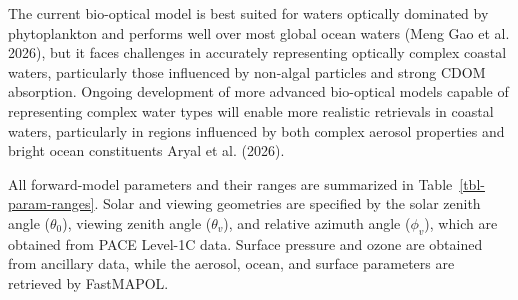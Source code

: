 \documentclass[
  11pt,
  letterpaper,
  DIV=11,
  numbers=noendperiod]{scrreprt}
\begin{document}
The current bio-optical model is best suited for waters optically
dominated by phytoplankton and performs well over most global ocean
waters (Meng Gao et al. 2026), but it faces challenges in accurately
representing optically complex coastal waters, particularly those
influenced by non-algal particles and strong CDOM absorption. Ongoing
development of more advanced bio-optical models capable of representing
complex water types will enable more realistic retrievals in coastal
waters, particularly in regions influenced by both complex aerosol
properties and bright ocean constituents Aryal et al. (2026).

All forward-model parameters and their ranges are summarized in
Table~\ref{tbl-param-ranges}. Solar and viewing geometries are specified
by the solar zenith angle (\(\theta_0\)), viewing zenith angle
(\(\theta_v\)), and relative azimuth angle (\(\phi_v\)), which are
obtained from PACE Level-1C data. Surface pressure and ozone are
obtained from ancillary data, while the aerosol, ocean, and surface
parameters are retrieved by FastMAPOL.
\end{document}
